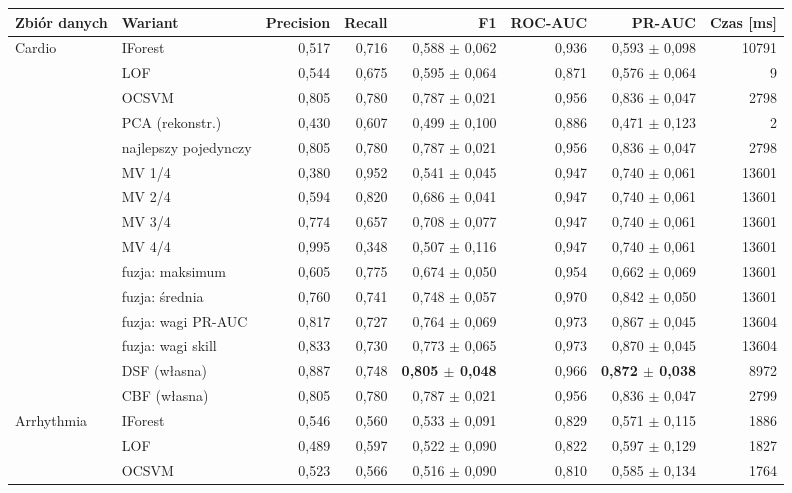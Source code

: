 \begin{longtable}{llrrrrrr}
\toprule
Zbiór danych & Wariant & Precision & Recall & F1 & ROC-AUC & PR-AUC & Czas [ms] \\
\midrule
\endhead
Cardio & IForest & 0,517 & 0,716 & 0,588 $\pm$ 0,062 & 0,936 & 0,593 $\pm$ 0,098 & 10791 \\
 & LOF & 0,544 & 0,675 & 0,595 $\pm$ 0,064 & 0,871 & 0,576 $\pm$ 0,064 & 9 \\
 & OCSVM & 0,805 & 0,780 & 0,787 $\pm$ 0,021 & 0,956 & 0,836 $\pm$ 0,047 & 2798 \\
 & PCA (rekonstr.) & 0,430 & 0,607 & 0,499 $\pm$ 0,100 & 0,886 & 0,471 $\pm$ 0,123 & 2 \\
\cmidrule(l){2-8}
 & najlepszy pojedynczy & 0,805 & 0,780 & 0,787 $\pm$ 0,021 & 0,956 & 0,836 $\pm$ 0,047 & 2798 \\
\cmidrule(l){2-8}
 & MV 1/4 & 0,380 & 0,952 & 0,541 $\pm$ 0,045 & 0,947 & 0,740 $\pm$ 0,061 & 13601 \\
 & MV 2/4 & 0,594 & 0,820 & 0,686 $\pm$ 0,041 & 0,947 & 0,740 $\pm$ 0,061 & 13601 \\
 & MV 3/4 & 0,774 & 0,657 & 0,708 $\pm$ 0,077 & 0,947 & 0,740 $\pm$ 0,061 & 13601 \\
 & MV 4/4 & 0,995 & 0,348 & 0,507 $\pm$ 0,116 & 0,947 & 0,740 $\pm$ 0,061 & 13601 \\
\cmidrule(l){2-8}
 & fuzja: maksimum & 0,605 & 0,775 & 0,674 $\pm$ 0,050 & 0,954 & 0,662 $\pm$ 0,069 & 13601 \\
 & fuzja: średnia & 0,760 & 0,741 & 0,748 $\pm$ 0,057 & 0,970 & 0,842 $\pm$ 0,050 & 13601 \\
 & fuzja: wagi PR-AUC & 0,817 & 0,727 & 0,764 $\pm$ 0,069 & 0,973 & 0,867 $\pm$ 0,045 & 13604 \\
 & fuzja: wagi skill & 0,833 & 0,730 & 0,773 $\pm$ 0,065 & 0,973 & 0,870 $\pm$ 0,045 & 13604 \\
 & DSF (własna) & 0,887 & 0,748 & \textbf{0,805 $\pm$ 0,048} & 0,966 & \textbf{0,872 $\pm$ 0,038} & 8972 \\
 & CBF (własna) & 0,805 & 0,780 & 0,787 $\pm$ 0,021 & 0,956 & 0,836 $\pm$ 0,047 & 2799 \\
\midrule
Arrhythmia & IForest & 0,546 & 0,560 & 0,533 $\pm$ 0,091 & 0,829 & 0,571 $\pm$ 0,115 & 1886 \\
 & LOF & 0,489 & 0,597 & 0,522 $\pm$ 0,090 & 0,822 & 0,597 $\pm$ 0,129 & 1827 \\
 & OCSVM & 0,523 & 0,566 & 0,516 $\pm$ 0,090 & 0,810 & 0,585 $\pm$ 0,134 & 1764 \\

\end{longtable}
